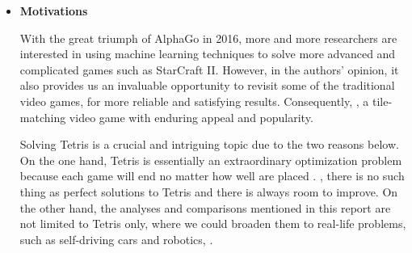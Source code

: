 \documentclass[letterpaper]{article} %
\begin{document}
%
\begin{itemize} 

  \item 
  {\bf Motivations}
  
  
  With the great triumph of AlphaGo in 2016, more and more researchers are interested in using machine learning techniques to solve more advanced and complicated games such as StarCraft II. However, in the authors' opinion, it also provides us  an invaluable opportunity to revisit some of the traditional video games,  for more reliable and satisfying results. Consequently, , a tile-matching video game with enduring appeal and popularity. 
  
  Solving Tetris is a crucial and intriguing topic due to the two reasons below. On the one hand, Tetris is essentially an extraordinary optimization problem because each game will end no matter how well  are placed \cite{burgiel_1997}. , there is no such thing as perfect solutions to Tetris and there is always room to improve. On the other hand, the analyses and comparisons mentioned in this report are not limited to Tetris only, where we could broaden them to real-life problems, such as self-driving cars and robotics, .
  

\end{itemize}
\end{document}
